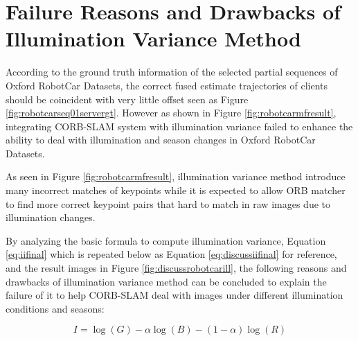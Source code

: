 
\section{Failure Reasons and Drawbacks of Illumination Variance Method}
\label{sec:discusslifelong}

According to the ground truth information of the selected partial sequences of Oxford RobotCar Datasets, the correct fused estimate trajectories of clients should be coincident with very little offset seen as Figure \ref{fig:robotcarseq01servergt}. However as shown in Figure \ref{fig:robotcarmfresult}, integrating CORB-SLAM system with illumination variance failed to enhance the ability to deal with illumination and season changes in Oxford RobotCar Datasets. 

As seen in Figure \ref{fig:robotcarmfresult}, illumination variance method introduce many incorrect matches of keypoints while it is expected to allow ORB matcher to find more correct keypoint pairs that hard to match in raw images due to illumination changes. 

By analyzing the basic formula to compute illumination variance, Equation \ref{eq:iifinal} which is repeated below as Equation \ref{eq:discussiifinal} for reference, and the result images in Figure \ref{fig:discussrobotcarill}, the following reasons and drawbacks of illumination variance method can be concluded to explain the failure of it to help CORB-SLAM deal with images under different illumination conditions and seasons: 

\begin{equation}
I=\log(G)-\alpha\log(B)-(1-\alpha)\log(R)
\label{eq:discussiifinal}
\end{equation}

